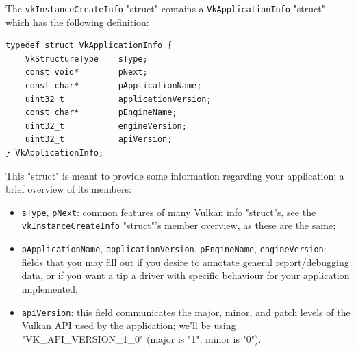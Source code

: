 \documentclass[12pt,letterpaper]{article}
\newcommand{\cil}[1]{\texttt{#1}}
\begin{document}
	The \cil{vkInstanceCreateInfo} "struct" contains a \cil{VkApplicationInfo} "struct" which has the following definition:
		\begin{verbatim}
typedef struct VkApplicationInfo {
	VkStructureType    sType;
	const void*        pNext;
	const char*        pApplicationName;
	uint32_t           applicationVersion;
	const char*        pEngineName;
	uint32_t           engineVersion;
	uint32_t           apiVersion;
} VkApplicationInfo;
		\end{verbatim}
	This "struct" is meant to provide some information regarding your application; a brief overview of its members:
		\begin{itemize}
			\item \cil{sType}, \cil{pNext}: common features of many Vulkan info "struct"s, see the \cil{vkInstanceCreateInfo} "struct"'s member overview, as these are the same;
			
			\item \cil{pApplicationName}, \cil{applicationVersion}, \cil{pEngineName}, \cil{engineVersion}: fields that you may fill out if you desire to annotate general report/debugging data, or if you want a tip a driver with specific behaviour for your application implemented;
			
			\item \cil{apiVersion}:  this field communicates the major, minor, and patch levels of the Vulkan API used by the application; we'll be using "VK\_API\_VERSION\_1\_0" (major is "1", minor is "0").
		\end{itemize}
	
\end{document}
